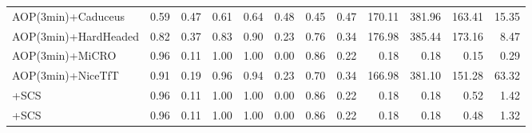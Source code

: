 \begin{tabular}{l|rr|r|rr|rr|rr|rr}
       AOP(3min)+Caduceus &    0.59 & 0.47 & 0.61 &          0.64 & 0.48 &          0.45 & 0.47 &   170.11 &   381.96 &  163.41 &    15.35 \\
     AOP(3min)+HardHeaded &    0.82 & 0.37 & 0.83 &          0.90 & 0.23 &          0.76 & 0.34 &   176.98 &   385.44 &  173.16 &     8.47 \\
          AOP(3min)+MiCRO &    0.96 & 0.11 & 1.00 &          1.00 & 0.00 &          0.86 & 0.22 &     0.18 &     0.18 &    0.15 &     0.29 \\
        AOP(3min)+NiceTfT &    0.91 & 0.19 & 0.96 &          0.94 & 0.23 &          0.70 & 0.34 &   166.98 &   381.10 &  151.28 &    63.32 \\
		\proposedir{}+SCS &    0.96 & 0.11 & 1.00 &          1.00 & 0.00 &          0.86 & 0.22 &     0.18 &     0.18 &    0.52 &     1.42 \\
		\proposednr{}+SCS &    0.96 & 0.11 & 1.00 &          1.00 & 0.00 &          0.86 & 0.22 &     0.18 &     0.18 &    0.48 &     1.32 \\
\bottomrule
\end{tabular}
